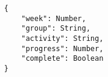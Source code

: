 
\begin{lstlisting}
	{
		"week": Number,
		"group": String,
		"activity": String,
		"progress": Number,
		"complete": Boolean
	}
\end{lstlisting}
